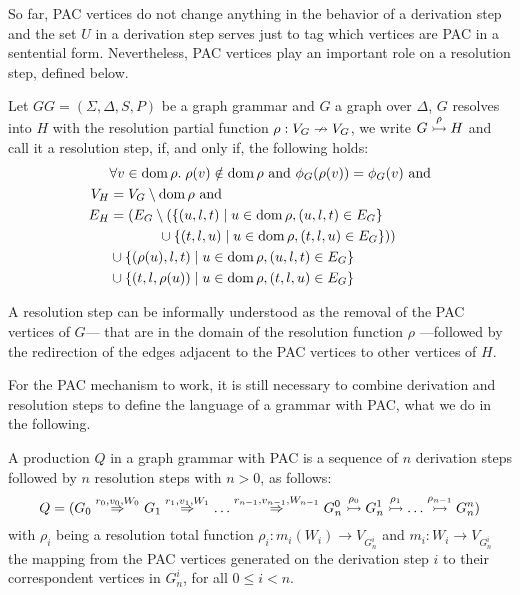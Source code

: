 So far, PAC vertices do not change anything in the behavior of a derivation step and the set $U$ in a derivation step serves just to tag which vertices are PAC in a sentential form. Nevertheless, PAC vertices play an important role on a resolution step, defined below.

\begin{definition}
	\label{def:resolv}
	Let $GG = (\Sigma, \Delta, S, P)$ be a graph grammar and $G$ a graph over $\Delta$, $G$ resolves into $H$ with the resolution partial function $\rho: V_G \nrightarrow V_G$, we write $G \overset{\rho}{\rightarrowtail} H$ and call it a resolution step, if, and only if, the following holds:
	\begin{align*}
		& \forall v \in \operatorname{dom} \rho . \; \rho(v) \notin \operatorname{dom} \rho \text{ and } \phi_G(\rho(v)) = \phi_G(v) \text{ and}\\
		V_H & = V_G \setminus \operatorname{dom} \rho \text{ and}\\
		E_H & = (E_G \setminus (\{(u,l,t) \; | \; u \in \operatorname{dom} \rho, (u,l,t) \in E_G\} \\
			&\hspace{3.5em} \cup \{(t,l,u) \; | \; u \in \operatorname{dom} \rho, (t,l,u) \in E_G\}))\\
		    & \cup \{(\rho(u),l,t) \; | \; u \in \operatorname{dom} \rho, (u,l,t) \in E_G\} \\
		    & \cup \{(t,l,\rho(u)) \; | \; u \in \operatorname{dom} \rho, (t,l,u) \in E_G\}
	\end{align*}
\end{definition}

A resolution step can be informally understood as the removal of the PAC vertices of $G$--- that are in the domain of the resolution function $\rho$ ---followed by the redirection of the edges adjacent to the PAC vertices to other vertices of $H$.

For the PAC mechanism to work, it is still necessary to combine derivation and resolution steps to define the language of a grammar with PAC, what we do in the following.

\begin{definition}
	A production $Q$ in a graph grammar with PAC is a sequence of $n$ derivation steps followed by $n$ resolution steps with $n > 0$, as follows:
	\begin{equation*}
		Q = (G_0 \overset{r_0,v_0,W_0}{\Rightarrow}_{} G_1 \overset{r_1,v_1,W_1}{\Rightarrow}_{} \dots \overset{r_{n-1},v_{n-1},W_{n-1}}{\Rightarrow}_{} G_n^0 \overset{\rho_0}{\rightarrowtail} G_n^1 \overset{\rho_1}{\rightarrowtail} \dots \overset{\rho_{n-1}}{\rightarrowtail} G_n^n)
	\end{equation*}
	with $\rho_i$ being a resolution total function $\rho_i : m_i(W_i) \to V_{G_n^i}$ and $m_i : W_i \to V_{G_n^i}$ the mapping from the PAC vertices generated on the derivation step $i$ to their correspondent vertices in $G_n^i$, for all $0 \le i < n$.
\end{definition}

